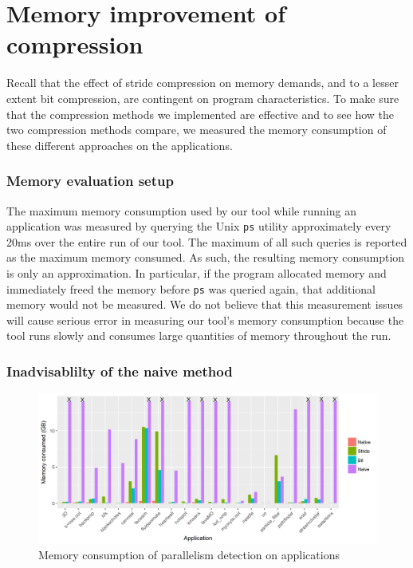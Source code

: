 \documentclass[12pt,twoside]{reedthesis}
\begin{document}
	\section{Memory improvement of compression}
		
		Recall that the effect of stride compression on memory demands, and to a lesser extent bit compression, are contingent on program characteristics. To make sure that the compression methods we implemented are effective and to see how the two compression methods compare, we measured the memory consumption of these different approaches on the applications. 
		
		\subsubsection{Memory evaluation setup}
		
		The maximum memory consumption used by our tool while running an application was measured by querying the Unix \texttt{ps} utility approximately every 20ms over the entire run of our tool. The maximum of all such queries is reported as the maximum memory consumed. As such, the resulting memory consumption is only an approximation. In particular, if the program allocated memory and immediately freed the memory before \texttt{ps} was queried again, that additional memory would not be measured. We do not believe that this measurement issues will cause serious error in measuring our tool's memory consumption because the tool runs slowly and consumes large quantities of memory throughout the run. %
		
		\subsubsection{Inadvisablilty of the naive method}
		
		
		\begin{figure}
			\caption{Memory consumption of parallelism detection on applications}
			\label{fig:mem-comp-plot}
			\includegraphics[scale=0.7]{plots/overall_plot.png}
		\end{figure}
		
\end{document}
